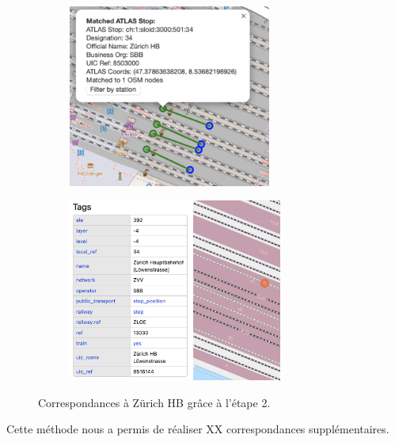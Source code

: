 \begin{figure}[h]
    \centering
    \begin{subfigure}[b]{0.45\textwidth}
        \centering
        \includegraphics[height=6cm]{../figures/correspondances/distance_2.png}
        \label{fig:zurich_atlas}
    \end{subfigure}
    \hspace{-0.2cm}  %
    \begin{subfigure}[b]{0.45\textwidth}
        \centering
        \includegraphics[height=6cm]{../figures/correspondances/osm_distance_2.png}
        \label{fig:zurich_osm}
    \end{subfigure}
    \caption[Correspondances – Zürich HB (étape 2)]{Correspondances à Zürich HB grâce à l'étape 2.}
    \label{fig:zurich_distance_2}
\end{figure}

Cette méthode nous a permis de réaliser XX correspondances supplémentaires.

